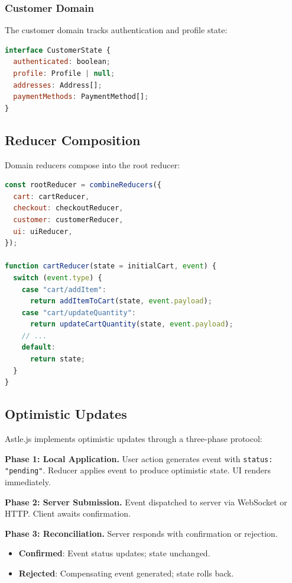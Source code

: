 \subsubsection{Customer Domain}

The customer domain tracks authentication and profile state:

\begin{lstlisting}[language=JavaScript,caption=Customer state]
interface CustomerState {
  authenticated: boolean;
  profile: Profile | null;
  addresses: Address[];
  paymentMethods: PaymentMethod[];
}
\end{lstlisting}

\subsection{Reducer Composition}

Domain reducers compose into the root reducer:

\begin{lstlisting}[language=JavaScript,caption=Root reducer composition]
const rootReducer = combineReducers({
  cart: cartReducer,
  checkout: checkoutReducer,
  customer: customerReducer,
  ui: uiReducer,
});

function cartReducer(state = initialCart, event) {
  switch (event.type) {
    case "cart/addItem":
      return addItemToCart(state, event.payload);
    case "cart/updateQuantity":
      return updateCartQuantity(state, event.payload);
    // ...
    default:
      return state;
  }
}
\end{lstlisting}

\subsection{Optimistic Updates}

Astle.js implements optimistic updates through a three-phase protocol:

\textbf{Phase 1: Local Application.} User action generates event with \texttt{status: "pending"}. Reducer applies event to produce optimistic state. UI renders immediately.

\textbf{Phase 2: Server Submission.} Event dispatched to server via WebSocket or HTTP. Client awaits confirmation.

\textbf{Phase 3: Reconciliation.} Server responds with confirmation or rejection.
\begin{itemize}
\item \textbf{Confirmed}: Event status updates; state unchanged.
\item \textbf{Rejected}: Compensating event generated; state rolls back.
\end{itemize}

